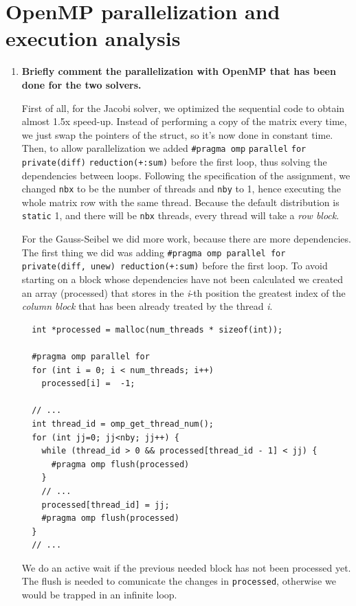 \documentclass[a4paper,11pt]{article}
\begin{document}
\section{OpenMP parallelization and execution analysis}
\begin{enumerate}
\setcounter{enumi}{0}
\item
\textbf{Briefly comment the parallelization with OpenMP that has been
  done for the two solvers.}

First of all, for the Jacobi solver, we optimized the sequential code
to obtain almost 1.5x speed-up. Instead of performing a copy of the
matrix every time, we just swap the pointers of the struct, so it's now done
in constant time. Then, to allow parallelization we added \texttt{\#pragma
  omp} \texttt{parallel} \texttt{for} \texttt{private(diff)}
\texttt{reduction(+:sum)} before the first loop, thus solving the
dependencies between loops. Following the specification of the
assignment, we changed \texttt{nbx} to be the number of threads and
\texttt{nby} to 1, hence executing the whole matrix row with the same
thread. Because the default distribution is \texttt{static} 1, and
there will be \texttt{nbx} threads, every thread will take a \emph{row
  block}.

For the Gauss-Seibel we did more work, because there are more
dependencies.  The first thing we did was adding \texttt{\#pragma omp
  parallel for private(diff, unew) reduction(+:sum)} before the first
loop. To avoid starting on a block whose dependencies have not been
calculated we created an array (processed) that stores in the
\emph{i}-th position the greatest index of the \emph{column block}
that has been already treated by the thread \emph{i}.

\begin{verbatim}
  int *processed = malloc(num_threads * sizeof(int));

  #pragma omp parallel for
  for (int i = 0; i < num_threads; i++)
    processed[i] =  -1;

  // ...
  int thread_id = omp_get_thread_num();
  for (int jj=0; jj<nby; jj++) {
    while (thread_id > 0 && processed[thread_id - 1] < jj) {
      #pragma omp flush(processed)
    }
    // ...
    processed[thread_id] = jj;
    #pragma omp flush(processed)
  }
  // ...
\end{verbatim}

We do an active wait if the previous needed block has not been processed
yet. The flush is needed to comunicate the changes in \texttt{processed}, otherwise
we would be trapped in an infinite loop.


\end{enumerate}
\end{document}
